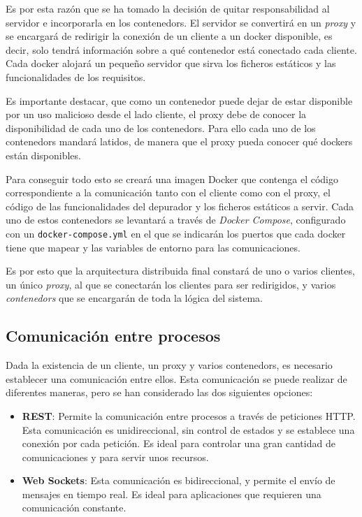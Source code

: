 

Es por esta razón que se ha tomado la decisión de quitar responsabilidad al servidor e incorporarla en los \glspl{contenedor}. El servidor se convertirá en un \textit{\gls{proxy}} y se encargará de redirigir la conexión de un cliente a un docker disponible, es decir, solo tendrá información sobre a qué \gls{contenedor} está conectado cada cliente. 
Cada docker alojará un pequeño servidor que sirva los ficheros estáticos y las funcionalidades de los requisitos.


Es importante destacar, que como un \gls{contenedor} puede dejar de estar disponible por un uso malicioso desde el lado cliente, el \gls{proxy} debe de conocer la disponibilidad de cada uno de los \glspl{contenedor}. Para ello cada uno de los \glspl{contenedor} mandará latidos, de manera que el \gls{proxy} pueda conocer qué dockers están disponibles.

Para conseguir todo esto se creará una \gls{imagen Docker} que contenga el código correspondiente a la comunicación tanto con el cliente como con el \gls{proxy}, el código de las funcionalidades del depurador y los ficheros estáticos a servir. Cada uno de estos \glspl{contenedor} se levantará a través de \textit{Docker Compose}, configurado con un \texttt{docker-compose.yml} en el que se indicarán los puertos que cada docker tiene que mapear y las variables de entorno para las comunicaciones. 

Es por esto que la arquitectura distribuida final constará de uno o varios clientes, un único \textit{proxy}, al que se conectarán los clientes para ser redirigidos, y varios \textit{\glspl{contenedor}} que se encargarán de toda la lógica del sistema.

\subsection{Comunicación entre procesos} \label{subsec:comunicacion-procesos}

Dada la existencia de un cliente, un \gls{proxy} y varios \glspl{contenedor}, es necesario establecer una comunicación entre ellos. Esta comunicación se puede realizar de diferentes maneras, pero se han considerado las dos siguientes opciones: 

\begin{itemize}
    \item \textbf{REST}: Permite la comunicación entre procesos a través de peticiones \gls{HTTP}. Esta comunicación es unidireccional, sin control de estados y se establece una conexión por cada petición. Es ideal para controlar una gran cantidad de comunicaciones y para servir unos recursos.
    \item \textbf{Web Sockets}: Esta comunicación es bidireccional, y permite el envío de mensajes en tiempo real. Es ideal para aplicaciones que requieren una comunicación constante.
\end{itemize}

